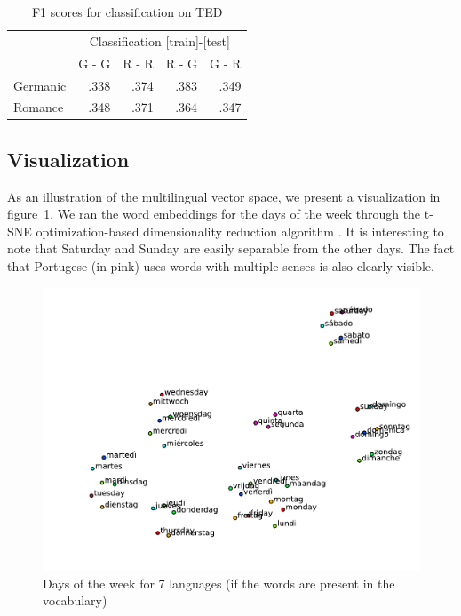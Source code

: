 \begin{table}[ht]
\center
\setlength\tabcolsep{2pt}
\begin{tabular}{l | r r r r}
		& \multicolumn{4}{c}{Classification [train]-[test]}	\\
		&G - G	&R - R	&R - G	&G - R	\\\hline
Germanic		&.338		&.374		&.383		&.349		\\
Romance		&.348		&.371		&.364		&.347		\\
\end{tabular}
\caption{F1 scores for classification on TED}
\label{t:dbow_families}
\end{table}



\subsection{Visualization}

As an illustration of the multilingual vector space, we present a visualization in figure~\ref{f:weekdays}.
We ran the word embeddings for the days of the week through the t-SNE optimization-based dimensionality reduction algorithm \cite{van2008visualizing}.
It is interesting to note that Saturday and Sunday are easily separable from the other days.
The fact that Portugese (in pink) uses words with multiple senses is also clearly visible.

\begin{figure}
\center
\includegraphics[width=1\linewidth]{figures/weekdays7}
\caption{Days of the week for 7 languages (if the words are present in the vocabulary)}
\label{f:weekdays}
\end{figure}
